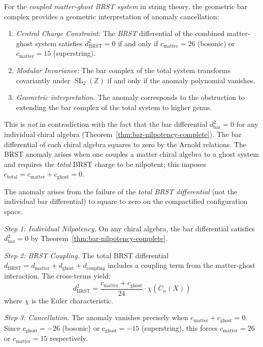 \begin{conjecture}\label{conj:anomaly-cancellation}
For the \emph{coupled matter-ghost BRST system} in string theory, the geometric bar complex provides a geometric interpretation of anomaly cancellation:

\begin{enumerate}
\item \emph{Central Charge Constraint:} The \emph{BRST} differential of the combined matter-ghost system satisfies $d_{\text{BRST}}^2 = 0$ if and only if $c_{\text{matter}} = 26$ (bosonic) or $c_{\text{matter}} = 15$ (superstring).

\item \emph{Modular Invariance:} The bar complex of the total system transforms covariantly under $\operatorname{SL}_2(\mathbb{Z})$ if and only if the anomaly polynomial vanishes.

\item \emph{Geometric interpretation.} The anomaly corresponds to the obstruction to extending the bar complex of the total system to higher genus.
\end{enumerate}

\begin{remark}
This is \emph{not} in contradiction with the fact that the bar differential $d_{\text{bar}}^2 = 0$ for any individual chiral algebra (Theorem~\ref{thm:bar-nilpotency-complete}). The bar differential of each chiral algebra squares to zero by the Arnold relations. The BRST anomaly arises when one couples a matter chiral algebra to a ghost system and requires the \emph{total} BRST charge to be nilpotent; this imposes $c_{\text{total}} = c_{\text{matter}} + c_{\text{ghost}} = 0$.
\end{remark}
\end{conjecture}

\begin{remark}
The anomaly arises from the failure of the \emph{total BRST differential} (not the individual bar differential) to square to zero on the compactified configuration space.

\emph{Step 1: Individual Nilpotency.} On any chiral algebra, the bar differential satisfies $d_{\text{bar}}^2 = 0$ by Theorem~\ref{thm:bar-nilpotency-complete}.

\emph{Step 2: BRST Coupling.} The total BRST differential $d_{\text{BRST}} = d_{\text{matter}} + d_{\text{ghost}} + d_{\text{coupling}}$ includes a coupling term from the matter-ghost interaction. The cross-terms yield:
\[d_{\text{BRST}}^2 = \frac{c_{\text{matter}} + c_{\text{ghost}}}{24} \cdot \chi(\overline{C}_n(X))\]
where $\chi$ is the Euler characteristic.

\emph{Step 3: Cancellation.} The anomaly vanishes precisely when $c_{\text{matter}} + c_{\text{ghost}} = 0$. Since $c_{\text{ghost}} = -26$ (bosonic) or $c_{\text{ghost}} = -15$ (superstring), this forces $c_{\text{matter}} = 26$ or $c_{\text{matter}} = 15$ respectively.
\end{remark}

